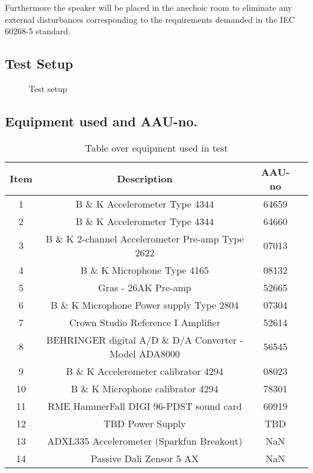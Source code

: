 Furthermore the speaker will be placed in the anechoic room to eliminate any external disturbances corresponding to the requirements demanded in the 
IEC 60268-5 standard.

\subsection*{Test Setup}

\begin{figure}[H]
\centering
{}
\scalebox{0.7}{

}
\caption{Test setup}
\label{figure:SpeakertestSetup2}
\end{figure}

\subsection*{Equipment used and AAU-no.}

\begin{table}[H]
\centering
{}
\begin{tabular}{S[table-format=1]ccc} \toprule
    {Item} & {Description} & {AAU-no} \\       &  B \& K Accelerometer Type 4344  & 64659   \\ 
    2      &  B \& K Accelerometer Type 4344  & 64660   \\ 
    3      &  B \& K 2-channel Accelerometer Pre-amp Type 2622  & 07013   \\
    4      &  B \& K Microphone Type 4165  & 08132   \\
    5      &  Gras - 26AK Pre-amp & 52665   \\
    6      &  B \& K Microphone Power supply Type 2804  & 07304   \\
    7      &  Crown Studio Reference I Amplifier & 52614   \\
    8      &  BEHRINGER digital A/D \& D/A Converter - Model ADA8000   & 56545   \\
    9      &  B \& K Accelerometer calibrator 4294 & 08023   \\
    10     &  B \& K Microphone calibrator 4294 & 78301   \\
    11     &  RME HammerFall DIGI 96-PDST sound card & 60919  \\
    12     &  TBD Power Supply & TBD  \\
    13     &  ADXL335 Accelerometer (Sparkfun Breakout) & NaN  \\
    14     &  Passive Dali Zensor 5 AX & NaN  \\ \bottomrule 
\end{tabular}
\caption{Table over equipment used in test}
\label{tab:UsedEquipment2}
\end{table}



